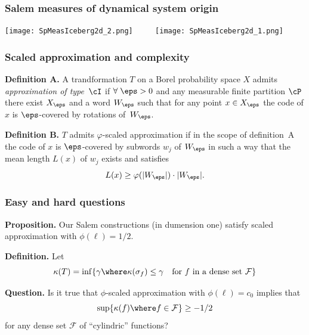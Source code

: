 \begin{frame}
  \frametitle{Salem measures of dynamical system origin}

  \texttt{[image: SpMeasIceberg2d\_2.png]} $\qquad $
  \texttt{[image: SpMeasIceberg2d\_1.png]}
  
\end{frame}


\begin{frame}
  \frametitle{Scaled approximation and complexity}

  {\bf Definition A.} A trandformation $T$ on a Borel probability space $X$ 
  admits {\it approximation of type}~$\cI$ if $\forall\; \eps > 0$ and any measurable finite partition $\cP$ 
  there exist $X_\eps$ and a word $W_\eps$ such that for any point $x \in X_\eps$ 
  the code of $x$ is $\eps$-covered by rotations of~$W_\eps$. 
  
  \bigskip
  {\bf Definition B.} $T$ admits $\varphi$-scaled approximation if 
  in the scope of definition~A the code of $x$ is $\eps$-covered by subwords $w_j$ of $W_\eps$ 
  in such a way that the mean length $L(x)$ of $w_j$ exists and satisfies 
  $$
    L(x) \ge \varphi(|W_\eps|) \cdot |W_\eps|. 
  $$
  
\end{frame}


\begin{frame}
  \frametitle{Easy and hard questions}
  
  {\bf Proposition.} Our Salem constructions (in dumension one) satisfy 
  scaled approximation with $\phi(\ell) = 1/2$. 

  \bigskip
  {\bf Definition.} Let 
  $$
    \kappa(T) = \inf\{ \gamma \where \kappa(\sigma_f) \le \gamma \quad \text{for $f$ in a dense set ${\mathcal F}$} \}
  $$
  
  \bigskip 
  {\bf Question.} Is it true that $\phi$-scaled approximation with $\phi(\ell) = c_0$ 
  implies that 
  $$
    \sup \{\kappa(f) \where f \in {\mathcal F} \} \ge -1/2
  $$
  for any dense set ${\mathcal F}$ of ``cylindric'' functions? 
\end{frame}



